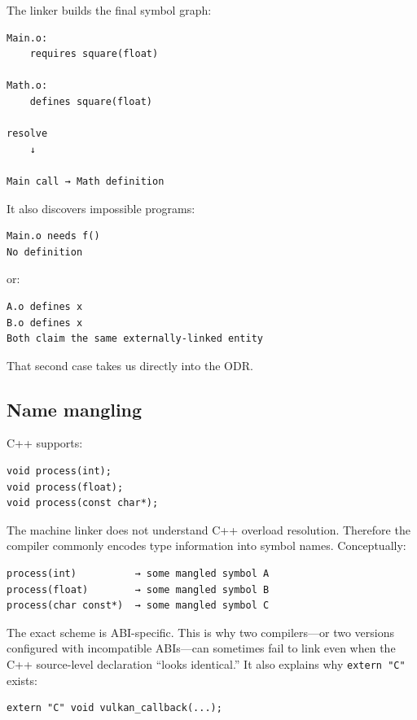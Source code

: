 The linker builds the final symbol graph:

\begin{verbatim}
Main.o:
    requires square(float)

Math.o:
    defines square(float)

resolve
    ↓

Main call → Math definition
\end{verbatim}

It also discovers impossible programs:

\begin{verbatim}
Main.o needs f()
No definition
\end{verbatim}

or:

\begin{verbatim}
A.o defines x
B.o defines x
Both claim the same externally-linked entity
\end{verbatim}

That second case takes us directly into the ODR.

\subsection{Name mangling}\label{05-engine-i-ch002-name-mangling}

C++ supports:

\begin{verbatim}
void process(int);
void process(float);
void process(const char*);
\end{verbatim}

The machine linker does not understand C++ overload resolution. Therefore the compiler commonly encodes type information into symbol names. Conceptually:

\begin{verbatim}
process(int)          → some mangled symbol A
process(float)        → some mangled symbol B
process(char const*)  → some mangled symbol C
\end{verbatim}

The exact scheme is ABI-specific. This is why two compilers---or two versions configured with incompatible ABIs---can sometimes fail to link even when the C++ source-level declaration ``looks identical.'' It also explains why \texttt{extern\ "C"} exists:

\begin{verbatim}
extern "C" void vulkan_callback(...);
\end{verbatim}

